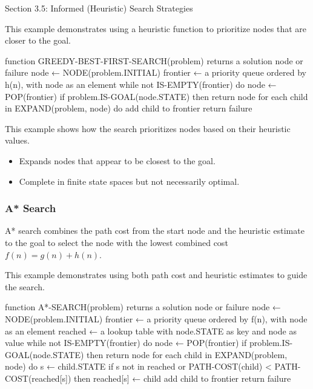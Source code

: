 \begin{notes}{Section 3.5: Informed (Heuristic) Search Strategies}
    \begin{highlight}
    
    This example demonstrates using a heuristic function to prioritize nodes that are closer to the goal.
    
    \begin{code}[Pseudo]
    function GREEDY-BEST-FIRST-SEARCH(problem) returns a solution node or failure
        node ← NODE(problem.INITIAL)
        frontier ← a priority queue ordered by h(n), with node as an element
        while not IS-EMPTY(frontier) do
            node ← POP(frontier)
            if problem.IS-GOAL(node.STATE) then return node
            for each child in EXPAND(problem, node) do
                add child to frontier
        return failure
    \end{code}
    
    This example shows how the search prioritizes nodes based on their heuristic values.
    
    \begin{itemize}
        \item Expands nodes that appear to be closest to the goal.
        \item Complete in finite state spaces but not necessarily optimal.
    \end{itemize}
    
    \end{highlight}
    
    \subsubsection*{A* Search}
    
    A* search combines the path cost from the start node and the heuristic estimate to the goal to select the node with the lowest combined cost $f(n) = g(n) + h(n)$.
    
    \begin{highlight}[A* Search]
    
    This example demonstrates using both path cost and heuristic estimates to guide the search.
    
    \begin{code}[Pseudo]
    function A*-SEARCH(problem) returns a solution node or failure
        node ← NODE(problem.INITIAL)
        frontier ← a priority queue ordered by f(n), with node as an element
        reached ← a lookup table with node.STATE as key and node as value
        while not IS-EMPTY(frontier) do
            node ← POP(frontier)
            if problem.IS-GOAL(node.STATE) then return node
            for each child in EXPAND(problem, node) do
                s ← child.STATE
                if s not in reached or PATH-COST(child) < PATH-COST(reached[s]) then
                    reached[s] ← child
                    add child to frontier
        return failure
    \end{code}
    

\end{highlight}
\end{notes}
